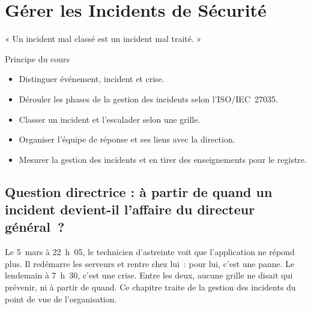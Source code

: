 
\chapter{Gérer les Incidents de Sécurité}
\label{chap:incidents}

\epigraph{%
    « Un incident mal classé est un incident mal traité. »%
}{Principe du cours}


\begin{boxobjectifs}
\begin{itemize}
    \item Distinguer événement, incident et crise.
    \item Dérouler les phases de la gestion des incidents selon
          l'ISO/IEC~27035.
    \item Classer un incident et l'escalader selon une grille.
    \item Organiser l'équipe de réponse et ses liens avec la direction.
    \item Mesurer la gestion des incidents et en tirer des enseignements
          pour le registre.
\end{itemize}
\end{boxobjectifs}

\bigskip

\section*{Question directrice : à partir de quand un incident devient-il l'affaire du directeur général~?}

Le 5~mars à 22~h~05, le technicien d'astreinte voit que l'application ne
répond plus. Il redémarre les serveurs et rentre chez lui~: pour lui,
c'est une panne. Le lendemain à 7~h~30, c'est une crise. Entre les deux,
aucune grille ne disait qui prévenir, ni à partir de quand. Ce chapitre
traite de la gestion des incidents du point de vue de l'organisation.

